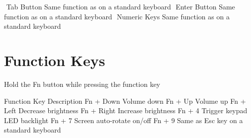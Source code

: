 \startxcell[align=center]
​{}
\stopxcell
\startxcell
Tab Button
\stopxcell
\startxcell
Same function as on a standard keyboard
\stopxcell
\stopxrow
\startxrow[body]
\startxcell[align=center]
​{}
\stopxcell
\startxcell
Enter Button
\stopxcell
\startxcell
Same function as on a standard keyboard
\stopxcell
\stopxrow
\startxrow[lastbody]
\startxcell[align=center]
​{}
\stopxcell
\startxcell
Numeric Keys
\stopxcell
\startxcell
Same function as on a standard keyboard
\stopxcell
\stopxrow
\stopxtablebody
\stopxtable
\stopplacetable

\section[function-keys]{Function Keys}

Hold the Fn button while pressing the function key

\startplacetable[title={System function keys}]
\startxtable
\startxtablehead
\startxrow[head]
\startxcell
Function Key
\stopxcell
\startxcell
Description
\stopxcell
\stopxrow
\stopxtablehead
\startxtablebody
\startxrow[body]
\startxcell
Fn + Down
\stopxcell
\startxcell
Volume down
\stopxcell
\stopxrow
\startxrow[body]
\startxcell
Fn + Up
\stopxcell
\startxcell
Volume up
\stopxcell
\stopxrow
\startxrow[body]
\startxcell
Fn + Left
\stopxcell
\startxcell
Decrease brightness
\stopxcell
\stopxrow
\startxrow[body]
\startxcell
Fn + Right
\stopxcell
\startxcell
Increase brightness
\stopxcell
\stopxrow
\startxrow[body]
\startxcell
Fn + 4
\stopxcell
\startxcell
Trigger keypad LED backlight
\stopxcell
\stopxrow
\startxrow[body]
\startxcell
Fn + 7
\stopxcell
\startxcell
Screen auto-rotate on/off
\stopxcell
\stopxrow
\startxrow[lastbody]
\startxcell
Fn + 9
\stopxcell
\startxcell
Same as Esc key on a standard keyboard
\stopxcell
\stopxrow
\stopxtablebody
\stopxtable
\stopplacetable